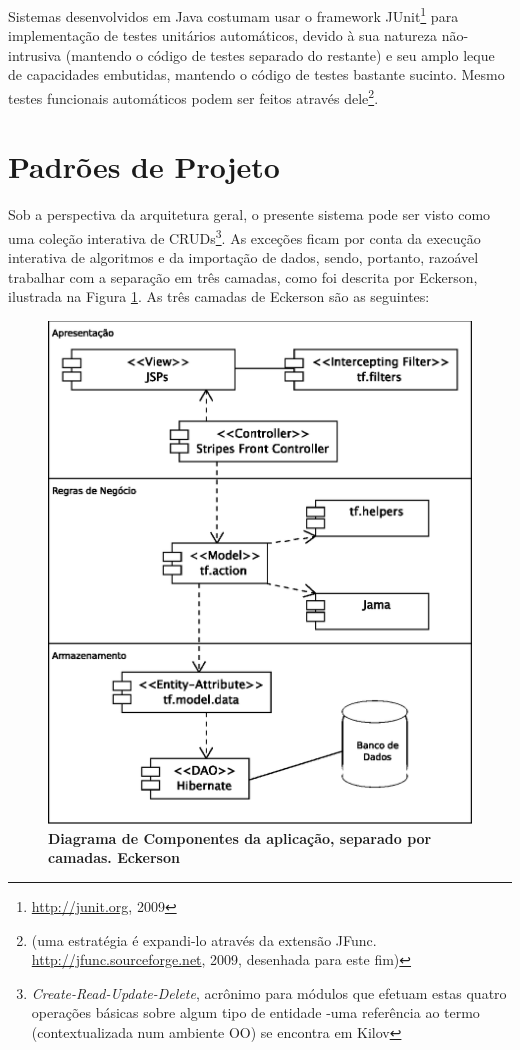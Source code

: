\documentclass{abnt}
\begin{document}
	Sistemas desenvolvidos em Java costumam usar o framework JUnit\footnote{\url{http://junit.org}, 2009} para implementação de testes unitários automáticos, devido à sua natureza não-intrusiva (mantendo o código de testes separado do restante) e seu amplo leque de capacidades embutidas, mantendo o código de testes bastante sucinto. Mesmo testes funcionais automáticos podem ser feitos através dele\footnote{(uma estratégia é expandi-lo através da extensão JFunc. \url{http://jfunc.sourceforge.net}, 2009, desenhada para este fim)}.

\section{Padrões de Projeto}

	Sob a perspectiva da arquitetura geral, o presente sistema pode ser visto como uma coleção interativa de CRUDs\footnote{\textit{Create-Read-Update-Delete}, acrônimo para módulos que efetuam estas quatro operações básicas sobre algum tipo de entidade -uma referência ao termo (contextualizada num ambiente OO) se encontra em Kilov\cite{kilov_crud}}. As exceções ficam por conta da execução interativa de algoritmos e da importação de dados, sendo, portanto, razoável trabalhar com a separação em três camadas, como foi  descrita por Eckerson\cite{Eckerson1995}, ilustrada na Figura \ref{deployment}. As três camadas de Eckerson são as seguintes:

\begin{figure}
\begin{center}
\includegraphics[scale=0.8]{deployment.eps}
\caption{{\bf Diagrama de Componentes da aplicação, separado por camadas. Eckerson\cite{Eckerson1995}}}
\label{deployment}
\end{center}
\end{figure}
\end{document}
